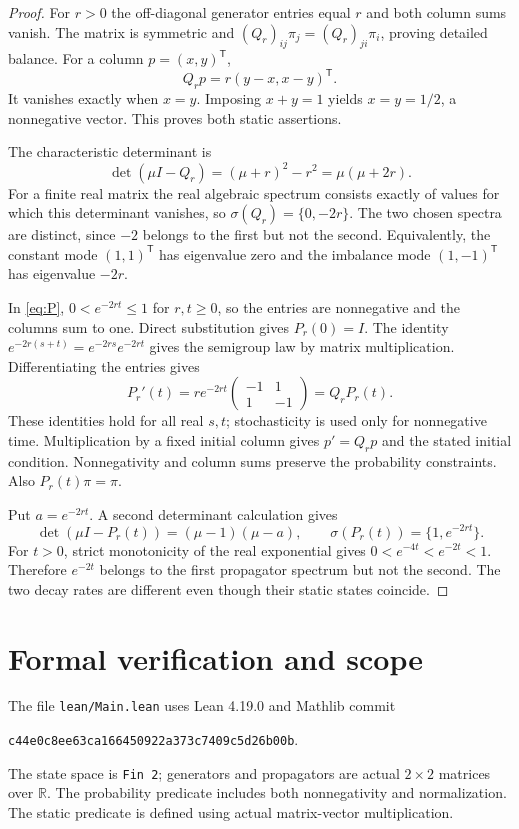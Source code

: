 \documentclass[11pt]{article}
\newcommand{\R}{\mathbb R}
\begin{document}
\begin{proof}
For $r>0$ the off-diagonal generator entries equal $r$ and both column
sums vanish. The matrix is symmetric and
$(Q_r)_{ij}\pi_j=(Q_r)_{ji}\pi_i$, proving detailed balance.
For a column $p=(x,y)^{\mathsf T}$,
\[
 Q_rp=r(y-x,x-y)^{\mathsf T}.
\]
It vanishes exactly when $x=y$. Imposing $x+y=1$ yields
$x=y=1/2$, a nonnegative vector. This proves both static assertions.

The characteristic determinant is
\[
 \det(\mu I-Q_r)=(\mu+r)^2-r^2=\mu(\mu+2r).
\]
For a finite real matrix the real algebraic spectrum consists exactly
of values for which this determinant vanishes, so
$\sigma(Q_r)=\{0,-2r\}$. The two chosen spectra are distinct, since
$-2$ belongs to the first but not the second. Equivalently, the constant
mode $(1,1)^{\mathsf T}$ has eigenvalue zero and the imbalance mode
$(1,-1)^{\mathsf T}$ has eigenvalue $-2r$.

In \eqref{eq:P}, $0<e^{-2rt}\leq1$ for $r,t\geq0$, so the entries
are nonnegative and the columns sum to one. Direct substitution gives
$P_r(0)=I$. The identity
$e^{-2r(s+t)}=e^{-2rs}e^{-2rt}$ gives the semigroup law by matrix
multiplication. Differentiating the entries gives
\[
 P_r'(t)=r e^{-2rt}
 \begin{pmatrix}-1&1\\1&-1\end{pmatrix}=Q_rP_r(t).
\]
These identities hold for all real $s,t$; stochasticity is used only
for nonnegative time. Multiplication by a fixed initial column gives
$p'=Q_rp$ and the stated initial condition. Nonnegativity and column
sums preserve the probability constraints. Also $P_r(t)\pi=\pi$.

Put $a=e^{-2rt}$. A second determinant calculation gives
\[
 \det(\mu I-P_r(t))=(\mu-1)(\mu-a),
 \qquad \sigma(P_r(t))=\{1,e^{-2rt}\}.
\]
For $t>0$, strict monotonicity of the real exponential gives
$0<e^{-4t}<e^{-2t}<1$. Therefore $e^{-2t}$ belongs to the first
propagator spectrum but not the second. The two decay rates are
different even though their static states coincide.
\end{proof}

\section*{Formal verification and scope}
The file \texttt{lean/Main.lean} uses Lean 4.19.0 and Mathlib commit
\begin{center}\texttt{c44e0c8ee63ca166450922a373c7409c5d26b00b}.\end{center}
The state space is \texttt{Fin 2}; generators and propagators are actual
$2\times2$ matrices over $\R$. The probability predicate includes both
nonnegativity and normalization. The static predicate is defined using
actual matrix-vector multiplication.
\end{document}
